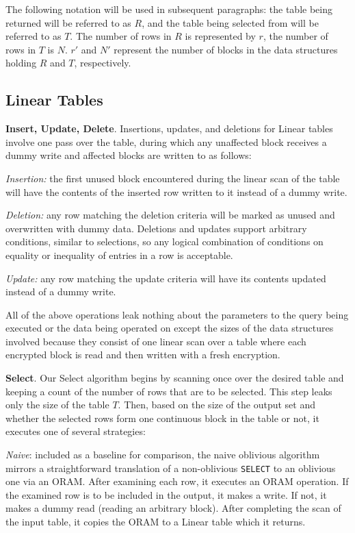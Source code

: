 \documentclass[letterpaper,twocolumn,10pt]{article}
\begin{document}
The following notation will be used in subsequent paragraphs: the table being returned will be referred to as $R$, and the table being selected from will be referred to as $T$. The number of rows in $R$ is represented by $r$, the number of rows in $T$ is $N$. $r'$ and $N'$ represent the number of blocks in the data structures holding $R$ and $T$, respectively.

\subsection{Linear Tables}
  \noindent \textbf{Insert, Update, Delete}.
Insertions, updates, and deletions for Linear tables involve one pass over the table, during which any unaffected block receives a dummy write and affected blocks are written to as follows:

\emph{Insertion:} the first unused block encountered during the linear scan of the table will have the contents of the inserted row written to it instead of a dummy write.

\emph{Deletion:} any row matching the deletion criteria will be marked as unused and overwritten with dummy data. Deletions and updates support arbitrary conditions, similar to selections, so any logical combination of conditions on equality or inequality of entries in a row is acceptable.

\emph{Update:} any row matching the update criteria will have its contents updated instead of a dummy write.


All of the above operations leak nothing about the parameters to the query being executed or the data being operated on except the sizes of the data structures involved because they consist of one linear scan over a table where each encrypted block is read and then written with a fresh encryption.

  \noindent \textbf{Select}.
Our Select algorithm begins by scanning once over the desired table and keeping a count of the number of rows that are to be selected. This step leaks only the size of the table $T$. Then, based on the size of the output set and whether the selected rows form one continuous block in the table or not, it executes one of several strategies:

\textit{Naive}: included as a baseline for comparison, the naive oblivious algorithm mirrors a straightforward translation of a non-oblivious \texttt{SELECT} to an oblivious one via an ORAM. After examining each row, it executes an ORAM operation. If the examined row is to be included in the output, it makes a write. If not, it makes a dummy read (reading an arbitrary block). After completing the scan of the input table, it copies the ORAM to a Linear table which it returns.
\end{document}
